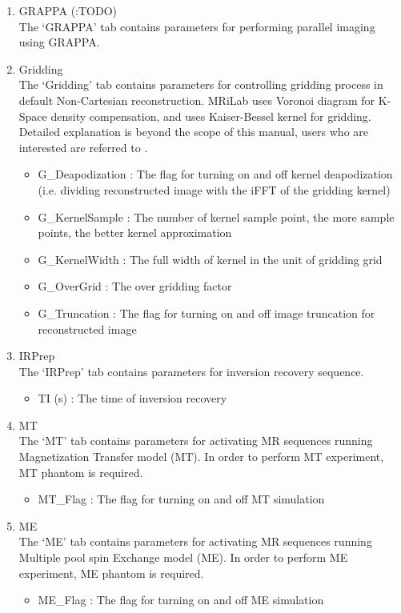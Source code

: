 \documentclass{book}%
\begin{document}
\begin{enumerate}
  \item GRAPPA (:TODO) \\
	The `GRAPPA' tab contains parameters for performing parallel imaging using GRAPPA.
	
  \item Gridding \\
	The `Gridding' tab contains parameters for controlling gridding process in default Non-Cartesian reconstruction. MRiLab uses Voronoi diagram for K-Space density compensation, and uses Kaiser-Bessel kernel for gridding. Detailed explanation is beyond the scope of this manual, users who are interested are referred to \cite{Jackson1991,VRasche1999,Beatty2005}.
		\begin{itemize}
			\item G\_Deapodization : The flag for turning on and off kernel deapodization (i.e. dividing reconstructed image with the iFFT of the gridding kernel)
			\item G\_KernelSample : The number of kernel sample point, the more sample points, the better kernel approximation
			\item G\_KernelWidth : The full width of kernel in the unit of gridding grid
			\item G\_OverGrid : The over gridding factor
			\item G\_Truncation : The flag for turning on and off image truncation for reconstructed image
		\end{itemize}
	
	\item IRPrep \\
	The `IRPrep' tab contains parameters for inversion recovery sequence.
		\begin{itemize}
			\item TI (s) : The time of inversion recovery
		\end{itemize}
		
	\item MT \\
	The `MT' tab contains parameters for activating MR sequences running Magnetization Transfer model (MT). In order to perform MT experiment, MT phantom is required.
		\begin{itemize}
			\item MT\_Flag : The flag for turning on and off MT simulation
		\end{itemize}
		
	\item ME \\
	The `ME' tab contains parameters for activating MR sequences running Multiple pool spin Exchange model (ME). In order to perform ME experiment, ME phantom is required.
	\begin{itemize}
		\item ME\_Flag : The flag for turning on and off ME simulation
	\end{itemize}
	

\end{enumerate}
\end{document}
